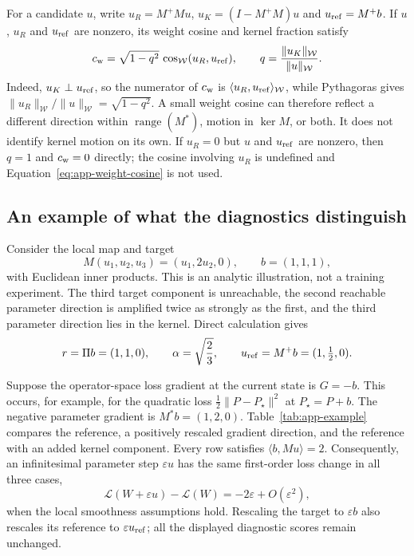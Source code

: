 \documentclass{article}
\theoremstyle{definition}
\theoremstyle{remark}
\begin{document}
For a candidate $u$, write $u_R=M^+Mu$, $u_K=(I-M^+M)u$ and $u_{\rm ref}=M^+b$. If $u$, $u_R$ and $u_{\rm ref}$ are nonzero, its weight cosine and kernel fraction satisfy
\begin{equation}
 c_{\rm w}=\sqrt{1-q^2}\,
     \cos_{\mathcal W}(u_R,u_{\rm ref}),
 \qquad q=\frac{\|u_K\|_{\mathcal W}}{\|u\|_{\mathcal W}}.
 \label{eq:app-weight-cosine}
\end{equation}
Indeed, $u_K\perp u_{\rm ref}$, so the numerator of $c_{\rm w}$ is $\langle u_R,u_{\rm ref}\rangle_{\mathcal W}$, while Pythagoras gives $\|u_R\|_{\mathcal W}/\|u\|_{\mathcal W}=\sqrt{1-q^2}$. A small weight cosine can therefore reflect a different direction within $\operatorname{range}(M^*)$, motion in $\ker M$, or both. It does not identify kernel motion on its own. If $u_R=0$ but $u$ and $u_{\rm ref}$ are nonzero, then $q=1$ and $c_{\rm w}=0$ directly; the cosine involving $u_R$ is undefined and Equation~\eqref{eq:app-weight-cosine} is not used.

\subsection{An example of what the diagnostics distinguish}
\label{app:diagnostic-example}

Consider the local map and target
\begin{equation}
 M(u_1,u_2,u_3)=(u_1,2u_2,0),\qquad b=(1,1,1),
 \label{eq:app-example-map}
\end{equation}
with Euclidean inner products. This is an analytic illustration, not a training experiment. The third target component is unreachable, the second reachable parameter direction is amplified twice as strongly as the first, and the third parameter direction lies in the kernel. Direct calculation gives
\begin{equation}
 r=\Pi b=(1,1,0),\qquad
 \alpha=\sqrt{\frac23},\qquad
 u_{\rm ref}=M^+b=(1,\tfrac12,0).
\end{equation}

Suppose the operator-space loss gradient at the current state is $G=-b$. This occurs, for example, for the quadratic loss $\tfrac12\|P-P_\star\|^2$ at $P_\star=P+b$. The negative parameter gradient is $M^*b=(1,2,0)$. Table~\ref{tab:app-example} compares the reference, a positively rescaled gradient direction, and the reference with an added kernel component. Every row satisfies $\langle b,Mu\rangle=2$. Consequently, an infinitesimal parameter step $\varepsilon u$ has the same first-order loss change in all three cases,
\begin{equation}
 \mathcal L(W+\varepsilon u)-\mathcal L(W)
 =-2\varepsilon+O(\varepsilon^2),
 \label{eq:app-example-loss}
\end{equation}
when the local smoothness assumptions hold. Rescaling the target to $\varepsilon b$ also rescales its reference to $\varepsilon u_{\rm ref}$; all the displayed diagnostic scores remain unchanged.
\end{document}
